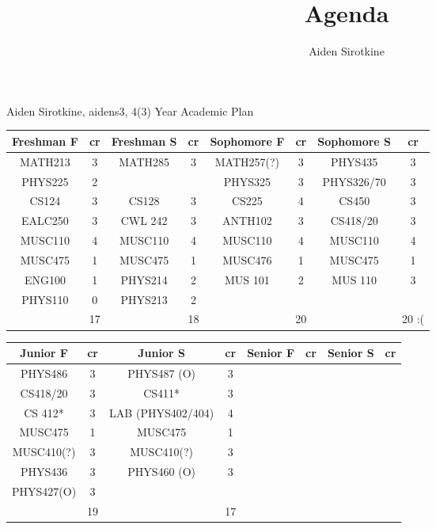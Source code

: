 \documentclass{article}
\date{}
\title{Agenda}
\author{Aiden Sirotkine}
\begin{document}
Aiden Sirotkine, aidens3, 4(3) Year Academic Plan
\begin{center}
\begin{tabular}{| c | c | c | c | c | c | c | c |}
Freshman F& cr & Freshman S & cr & Sophomore F & cr & Sophomore S & cr  \\ \hline
MATH213 & 3 & MATH285 & 3 & MATH257(?) & 3 & PHYS435& 3\\ \hline
PHYS225 & 2 & & & PHYS325 & 3 & PHYS326/70 & 3\\ \hline
CS124 & 3 & CS128 & 3 & CS225 & 4 & CS450 & 3\\ \hline
EALC250 & 3 & CWL 242 & 3 & ANTH102 & 3 & CS418/20 & 3 \\ \hline
MUSC110 & 4 & MUSC110 & 4 & MUSC110 & 4 & MUSC110 & 4\\ \hline
MUSC475 & 1 & MUSC475 & 1 & MUSC476 & 1 & MUSC475 & 1 \\ \hline
ENG100 & 1 & PHYS214 & 2 & MUS 101 & 2 & MUS 110 & 3 \\ \hline
PHYS110 & 0 & PHYS213 & 2\\ \hline
 & 17 & & 18 & & 20 & & 20 :(\\ \hline


\end{tabular}
\end{center}

\begin{center}
\begin{tabular}{| c | c | c | c | c | c | c | c |}
Junior F& cr & Junior S & cr & Senior F & cr & Senior S & cr  \\ \hline
PHYS486 & 3 &  PHYS487 (O) & 3\\ \hline
CS418/20 & 3 & CS411* & 3 \\ \hline
CS 412* & 3 & LAB (PHYS402/404) & 4 	\\ \hline
MUSC475 & 1 & MUSC475 & 1 \\ \hline
MUSC410(?) & 3 & MUSC410(?) & 3 \\ \hline
PHYS436 & 3 & PHYS460 (O) & 3 \\ \hline
PHYS427(O) & 3 & & \\ \hline
& 19 & & 17 \\ \hline


\end{tabular}
\end{center}


\end{document}
